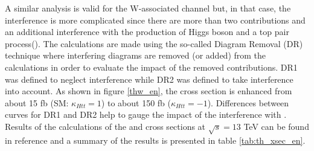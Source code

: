 \noindent A similar analysis is valid for the W-associated channel but, in that case, the interference is more complicated since there are more than two contributions and an additional interference with the production of Higgs boson and a top pair process(\ttH). The calculations are made using the so-called Diagram Removal (DR) technique where interfering diagrams are removed (or added) from the calculations in order to evaluate the impact of the removed contributions. DR1 was defined to neglect \ttH interference while DR2 was defined to take \ttH interference into account\cite{demartin}. As shown in figure \ref{thw_en}, the \tHW cross section is enhanced from about 15 fb (SM: $\kappa_{Htt}=1$) to about 150 fb ($\kappa_{Htt}=-1$). Differences between curves for DR1 and DR2 help to gauge the impact of the interference with \ttH.\\      
\noindent Results of the calculations of the \tHq and \tHW cross sections at $\sqrt{s}=13$ TeV can be found in reference \cite{yellow} and a summary of the results is presented in table \ref{tab:th_xsec_en}.
